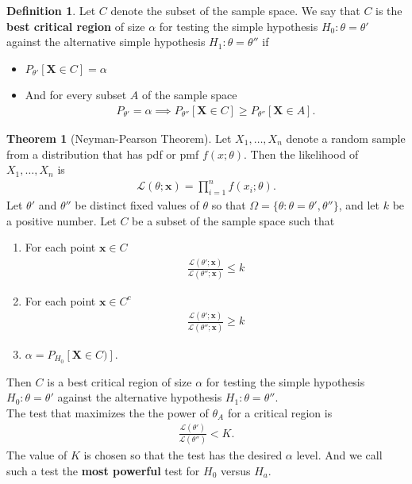 \documentclass{book}
\theoremstyle{definition}
\newtheorem{defn}{Definition}[section]
\newtheorem{thm}{Theorem}[section]
\newcommand{\lag}{\mathcal{L}}
\newcommand{\al}{\alpha}
\newcommand{\f}[2]{\frac{#1}{#2}}
\begin{document}
\begin{defn}
	Let $C$ denote the subset of the sample space. We say that $C$ is the \textbf{best critical region} of size $\al$ for testing the simple hypothesis $H_0 : \theta = \theta'$ against the alternative simple hypothesis $H_1 : \theta = \theta''$ if 
	\begin{itemize}
		\item $P_{\theta'} [\bm X \in C] = \alpha$
		
		\item And for every subset $A$ of the sample space 
		\begin{align}
		P_{\theta'} = \al \implies P_{\theta''}[\bm X \in C] \geq P_{\theta''}[\bm X \in A].
		\end{align}
	\end{itemize}
\end{defn}








\begin{thm}[Neyman-Pearson Theorem]
	Let $X_1,\dots,X_n$ denote a random sample from a distribution that has pdf or pmf $f(x;\theta)$. Then the likelihood of $X_1,\dots,X_n$ is 
	\begin{align}
	\lag(\theta;\bm x) = \prod^n_{i=1}f(x_i;\theta).
	\end{align}
	Let $\theta'$ and $\theta''$ be distinct fixed values of $\theta$ so that $\Omega = \{\theta : \theta = \theta', \theta''\}$, and let $k$ be a positive number. Let $C$ be a subset of the sample space such that 
	\begin{enumerate}
		\item For each point $\bm x \in C$
		\begin{align}
		\f{\lag(\theta';\bm x)}{\lag(\theta'';\bm x)} \leq k
		\end{align}
		
		\item For each point $\bm x \in C^c$
		\begin{align}
		\f{\lag(\theta';\bm x)}{\lag(\theta'';\bm x)} \geq k
		\end{align}
		
		\item $\alpha  = P_{H_0}[\bm X \in C)]$.
	\end{enumerate}
	Then $C$ is a best critical region of size $\al$ for testing the simple hypothesis $H_0: \theta = \theta'$ against the alternative hypothesis $H_1 : \theta = \theta''$. \\
	
	The test that maximizes the the power of $\theta_A$ for a critical region is 
	\begin{align}
	\f{\lag(\theta')}{\lag(\theta'')} < K .
	\end{align}
	The value of $K$ is chosen so that the test has the desired $\al$ level. And we call such a test the \textbf{most powerful} test for $H_0$ versus $H_a$. 
\end{thm}
\end{document}

